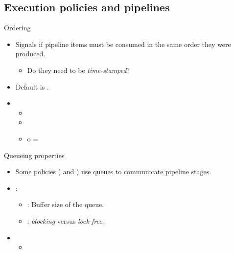 \subsection{Execution policies and pipelines}

\begin{frame}[t]{Ordering}
\begin{itemize}
  \item Signals if pipeline items must be consumed in the same order they were produced.
    \begin{itemize}
      \item Do they need to be \emph{time-stamped}?
    \end{itemize}

  \vfill
  \item Default is .

  \vfill
  \item {}
    \begin{itemize}
      \item {}
      \item {}
      \item {} o = 
    \end{itemize}
\end{itemize}
\end{frame}

\begin{frame}{Queueing properties}
\begin{itemize}
  \item Some policies ( and ) use queues to
        communicate pipeline stages.

  \vfill
  \item {}:
    \begin{itemize}
      \item {}: Buffer size of the queue.
      \item {}: \emph{blocking} versus \emph{lock-free}.
    \end{itemize}

  \vfill
  \item {}
    \begin{itemize}
      \item {}
    \end{itemize}
\end{itemize}
\end{frame}
